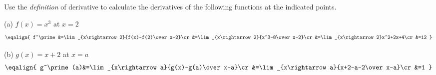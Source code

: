 
Use the {\it definition} of derivative to calculate the derivatives of the
following functions at the indicated points.

\medskip
(a) $f(x)=x^3$ at $x=2$
\medskip
$$\eqalign{
f^\prime&=\lim_{x\rightarrow2}{f(x)-f(2)\over x-2}\cr
&=\lim_{x\rightarrow2}{x^3-8\over x-2}\cr
&=\lim_{x\rightarrow2}x^2+2x+4\cr
&=12
}$$

\medskip
(b) $g(x)=x+2$ at $x=a$
\medskip
$$\eqalign{
g^\prime(a)&=\lim_{x\rightarrow a}{g(x)-g(a)\over x-a}\cr
&=\lim_{x\rightarrow a}{x+2-a-2\over x-a}\cr
&=1
}$$
